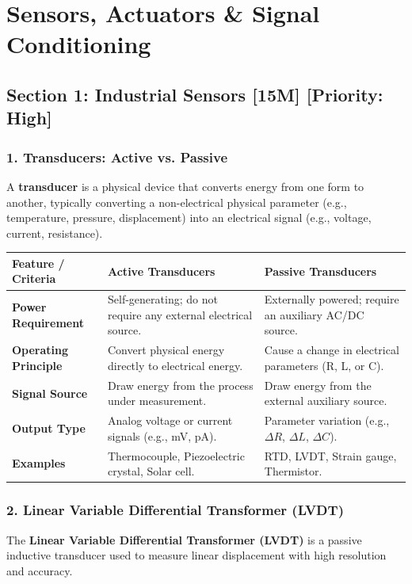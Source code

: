 \chapter{Sensors, Actuators \& Signal Conditioning}



\section{Section 1: Industrial Sensors [15M] [Priority: High]}

\subsection{1. Transducers: Active vs. Passive}
A \textbf{transducer} is a physical device that converts energy from one form to another, typically converting a non-electrical physical parameter (e.g., temperature, pressure, displacement) into an electrical signal (e.g., voltage, current, resistance).

\begin{table}[H]
\centering
\begin{tabular}{|p{}|p{}|p{}|}
\hline
Feature / Criteria & Active Transducers & Passive Transducers \\
\hline
\textbf{Power Requirement} & Self-generating; do not require any external electrical source. & Externally powered; require an auxiliary AC/DC source. \\
\hline
\textbf{Operating Principle} & Convert physical energy directly to electrical energy. & Cause a change in electrical parameters (R, L, or C). \\
\hline
\textbf{Signal Source} & Draw energy from the process under measurement. & Draw energy from the external auxiliary source. \\
\hline
\textbf{Output Type} & Analog voltage or current signals (e.g., mV, pA). & Parameter variation (e.g., $\Delta R$, $\Delta L$, $\Delta C$). \\
\hline
\textbf{Examples} & Thermocouple, Piezoelectric crystal, Solar cell. & RTD, LVDT, Strain gauge, Thermistor. \\
\hline
\end{tabular}
\end{table}


\subsection{2. Linear Variable Differential Transformer (LVDT)}
The \textbf{Linear Variable Differential Transformer (LVDT)} is a passive inductive transducer used to measure linear displacement with high resolution and accuracy.

